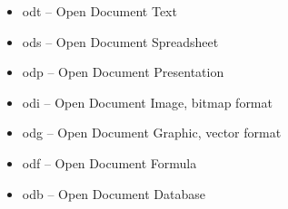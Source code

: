 \begin{itemize}
\item {
odt -- Open Document Text}
\item {
ods -- Open Document Spreadsheet}
\item {
odp -- Open Document Presentation}
\item {
odi -- Open Document Image, bitmap format}
\item {
odg -- Open Document Graphic, vector format}
\item {
odf -- Open Document Formula}
\item {
odb -- Open Document Database}
\end{itemize}
